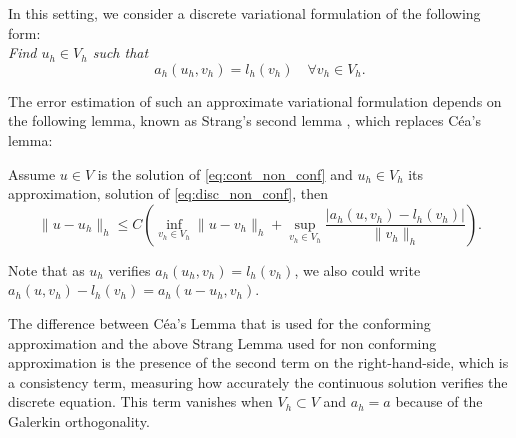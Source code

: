 In this setting, we consider a discrete variational formulation of the following form:\\
\emph{  Find $u_h\in V_h$ such that}
\begin{equation}\label{eq:disc_non_conf}
 a_h(u_h,v_h) = l_h(v_h) \quad\forall v_h\in V_h.
\end{equation}

The error estimation of such an approximate variational formulation depends on the following lemma, known as Strang's second lemma \cite{strang-fix}, which replaces C\'ea's lemma:
\begin{lemma}[Strang]\label{lemma:strang2}
Assume $u\in V$ is the solution of \eqref{eq:cont_non_conf} and $u_h\in V_h$ its  approximation, solution of \eqref{eq:disc_non_conf}, then
\begin{equation}\label{eq:err_non_conf}
\|u-u_h\|_h \leq C \left(\inf_{v_h\in V_h} \|u-v_h\|_h + \sup_{v_h\in V_h} \frac{|a_h(u,v_h)-l_h(v_h)|}{\|v_h\|_h} \right).
\end{equation}
\end{lemma}
Note that as $u_h$ verifies $a_h(u_h,v_h) = l_h(v_h)$, we also could write 
$a_h(u,v_h)-l_h(v_h)=a_h(u-u_h,v_h)$.
\begin{remark}
The difference between C\'ea's Lemma that is used for the conforming approximation and the above Strang Lemma used for non conforming approximation is the presence of the second term on the right-hand-side, which is a consistency term, measuring how accurately the continuous solution verifies the discrete equation. This term vanishes when  $V_h\subset V$ and $a_h=a$ because of the Galerkin orthogonality.
\end{remark}
